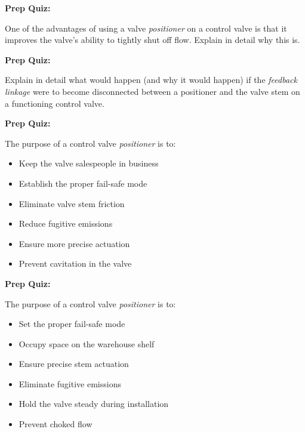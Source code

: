 \vfil \eject

\noindent
{\bf Prep Quiz:}

One of the advantages of using a valve {\it positioner} on a control valve is that it improves the valve's ability to tightly shut off flow.  Explain in detail why this is.








\vfil \eject

\noindent
{\bf Prep Quiz:}

Explain in detail what would happen (and why it would happen) if the {\it feedback linkage} were to become disconnected between a positioner and the valve stem on a functioning control valve.










\vfil \eject

\noindent
{\bf Prep Quiz:}

The purpose of a control valve {\it positioner} is to:

\begin{itemize}
\item{} Keep the valve salespeople in business
\vskip 5pt
\item{} Establish the proper fail-safe mode 
\vskip 5pt
\item{} Eliminate valve stem friction
\vskip 5pt
\item{} Reduce fugitive emissions
\vskip 5pt
\item{} Ensure more precise actuation 
\vskip 5pt
\item{} Prevent cavitation in the valve 
\end{itemize}



\vfil \eject

\noindent
{\bf Prep Quiz:}

The purpose of a control valve {\it positioner} is to:

\begin{itemize}
\item{} Set the proper fail-safe mode 
\vskip 5pt
\item{} Occupy space on the warehouse shelf
\vskip 5pt
\item{} Ensure precise stem actuation 
\vskip 5pt
\item{} Eliminate fugitive emissions
\vskip 5pt
\item{} Hold the valve steady during installation
\vskip 5pt
\item{} Prevent choked flow 
\end{itemize}





